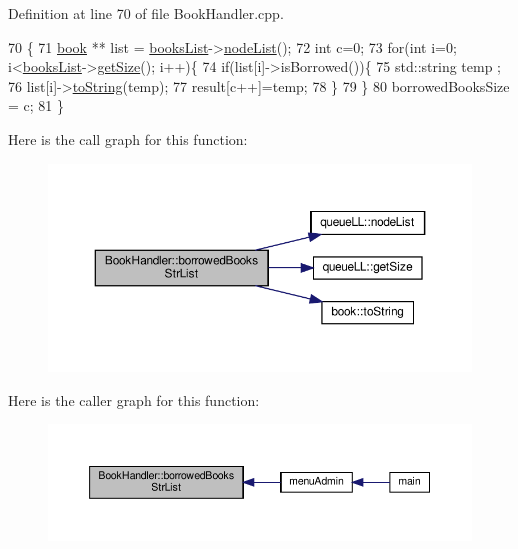 Definition at line 70 of file Book\+Handler.\+cpp.


\begin{DoxyCode}
70                                                                                   \{
71     \hyperlink{classbook}{book} ** list = \hyperlink{class_book_handler_a13a6c78422b3ad7acd5ebdb9555a0286}{booksList}->\hyperlink{classqueue_l_l_ae9a479b9463f51c5148dd80b68335d32}{nodeList}();
72     \textcolor{keywordtype}{int} c=0;
73     \textcolor{keywordflow}{for}(\textcolor{keywordtype}{int} i=0; i<\hyperlink{class_book_handler_a13a6c78422b3ad7acd5ebdb9555a0286}{booksList}->\hyperlink{classqueue_l_l_a8969feebcb563f0b489bc112422b9563}{getSize}(); i++)\{
74         \textcolor{keywordflow}{if}(list[i]->isBorrowed())\{
75             std::string temp ;
76             list[i]->\hyperlink{classbook_a458d26a8ddd01f69083a68eb68bf2181}{toString}(temp);
77             result[c++]=temp;
78         \}
79     \}
80     borrowedBooksSize = c;
81 \}
\end{DoxyCode}
Here is the call graph for this function\+:
\nopagebreak
\begin{figure}[H]
\begin{center}
\leavevmode
\includegraphics[width=350pt]{class_book_handler_ac0274027fa9375870ffb08fbb6377a7d_cgraph}
\end{center}
\end{figure}
Here is the caller graph for this function\+:
\nopagebreak
\begin{figure}[H]
\begin{center}
\leavevmode
\includegraphics[width=350pt]{class_book_handler_ac0274027fa9375870ffb08fbb6377a7d_icgraph}
\end{center}
\end{figure}
\mbox{\label{class_book_handler_aab461b060b38d51586ed043143b4bc68}} 
